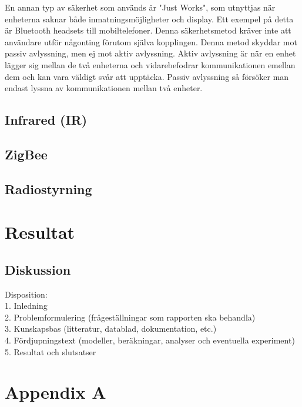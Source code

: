 \documentclass[a4paper,12pt,fleqn]{article}
\begin{document}
En annan typ av säkerhet som används är "Just Works", som utnyttjas när enheterna saknar både inmatningsmöjligheter och display. Ett exempel på detta är Bluetooth headsets till mobiltelefoner. Denna säkerhetsmetod kräver inte att användare utför någonting förutom själva kopplingen. Denna metod skyddar mot passiv avlyssning, men ej mot aktiv avlyssning. 
Aktiv avlyssning är när en enhet lägger sig mellan de två enheterna och vidarebefodrar kommunikationen emellan dem och kan vara väldigt svår att upptäcka.
Passiv avlyssning så försöker man endast lyssna av kommunikationen mellan två enheter. 


 
\subsection{Infrared (IR)}
\subsection{ZigBee}
\subsection{Radiostyrning}
\section{Resultat}
\subsection{Diskussion}

Disposition: 
\\
1. Inledning 
\\
2. Problemformulering (frågeställningar som rapporten ska behandla) 
\\
3. Kunskapsbas (litteratur, datablad, dokumentation, etc.) 
\\
4. Fördjupningstext (modeller, beräkningar, analyser och eventuella experiment) 
\\
5. Resultat och slutsatser 






\newpage
\appendix
\pagestyle{empty}
\section{Appendix A}
\end{document}
